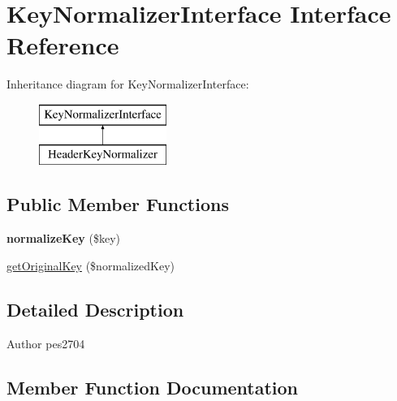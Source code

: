 \hypertarget{interface_pes_1_1_collection_1_1_normalizer_1_1_key_normalizer_interface}{}\section{Key\+Normalizer\+Interface Interface Reference}
\label{interface_pes_1_1_collection_1_1_normalizer_1_1_key_normalizer_interface}
Inheritance diagram for Key\+Normalizer\+Interface\+:\begin{figure}[H]
\begin{center}
\leavevmode
\includegraphics[height=2.000000cm]{interface_pes_1_1_collection_1_1_normalizer_1_1_key_normalizer_interface}
\end{center}
\end{figure}
\subsection*{Public Member Functions}
\begin{DoxyCompactItemize}
\item 
\mbox{\label{interface_pes_1_1_collection_1_1_normalizer_1_1_key_normalizer_interface_af39c624090b7badef56311d62a041c50}} 
{\bfseries normalize\+Key} (\$key)
\item 
\mbox{\hyperlink{interface_pes_1_1_collection_1_1_normalizer_1_1_key_normalizer_interface_ad96b455525cff93be0dc81b5f6a4f8b9}{get\+Original\+Key}} (\$normalized\+Key)
\end{DoxyCompactItemize}


\subsection{Detailed Description}
\begin{DoxyAuthor}{Author}
pes2704 
\end{DoxyAuthor}


\subsection{Member Function Documentation}
\mbox{\label{interface_pes_1_1_collection_1_1_normalizer_1_1_key_normalizer_interface_ad96b455525cff93be0dc81b5f6a4f8b9}} 
